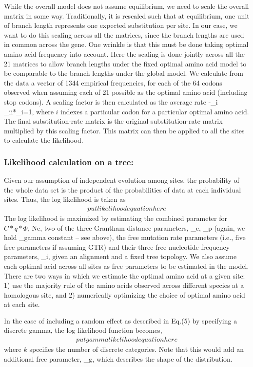 \documentclass{article}
\begin{document}
While the overall model does not assume equilibrium, we need to scale the overall matrix in some way.
Traditionally, it is rescaled such that at equilibrium, one unit of branch length represents one expected substitution per site.
In our case, we want to do this scaling across all the matrices, since the branch lengths are used in common across the gene.
One wrinkle is that this must be done taking optimal amino acid frequency into account. 
Here the scaling is done jointly across all the 21 matrices to allow branch lengths under the fixed optimal amino acid model to be comparable to the branch lengths under the global model.
We calculate from the data a vector of 1344 empirical frequencies, \pi for each of the 64 codons observed when assuming each of 21 possible as the optimal amino acid (including stop codons).
A scaling factor is then calculated as the average rate -\sum_i{} \mu_ii*\pi_i=1, where $i$ indexes a particular codon for a particular optimal amino acid.
The final substitution-rate matrix is the original substitution-rate matrix multiplied by this scaling factor.
This matrix can then be applied to all the sites to calculate the likelihood. 

\subsubsection*{Likelihood calculation on a tree: }
Given our assumption of independent evolution among sites, the probability of the whole data set is the product of the probabilities of data at each individual sites.
Thus, the log likelihood is taken as 
\begin{align*}
put likelihood equation here
\end{align*}
The log likelihood is maximized by estimating the combined parameter for $C*q*\Phi$, Ne, two of the three Grantham distance parameters, \alpha_c, \alpha_p (again, we hold \alpha_gamma constant -- see above), the free mutation rate parameters (i.e., five free parameters if assuming GTR) and their three free nucleotide frequency parameters, \pi_i, given an alignment and a fixed tree topology.
We also assume each optimal acid across all sites as free parameters to be estimated in the model.
There are two ways in which we estimate the optimal amino acid at a given site: 1) use the majority rule of the amino acids observed across different species at a homologous site, and 2) numerically optimizing the choice of optimal amino acid at each site. 

In the case of including a random effect as described in Eq.(5) by specifying a discrete gamma, the log likelihood function becomes,
\begin{align*}
put gamma likelihood equation here
\end{align*}
where $k$ specifies the number of discrete categories.
Note that this would add an additional free parameter, \alpha_g, which describes the shape of the distribution.
\end{document}
